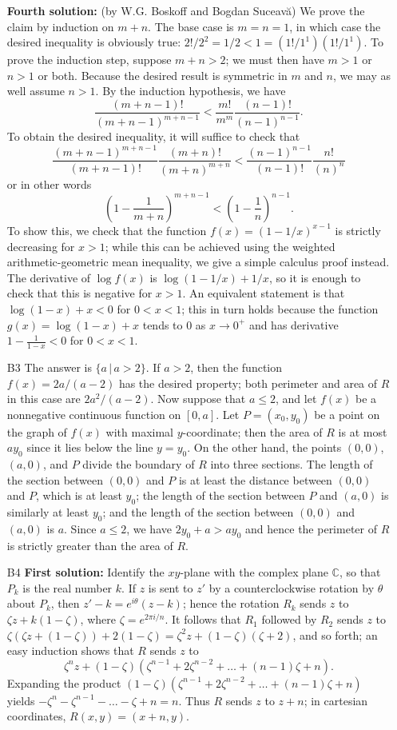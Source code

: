 \documentclass[amssymb,twocolumn,pra,10pt,aps]{revtex4-1}
\begin{document}
\begin{itemize}
\textbf{Fourth solution:} (by W.G. Boskoff and Bogdan Suceav\u{a})
We prove the claim by induction on $m+n$. The base case is $m=n=1$, in which case
the desired inequality is obviously true: $2!/2^2 = 1/2 < 1 = (1!/1^1)(1!/1^1)$.
To prove the induction step, suppose $m+n > 2$; we must then have $m>1$ or $n>1$ or both.
Because the desired result is symmetric in $m$ and $n$, we may as well assume $n > 1$.
By the induction hypothesis, we have
\[
\frac{(m+n-1)!}{(m+n-1)^{m+n-1}} < \frac{m!}{m^m} \frac{(n-1)!}{(n-1)^{n-1}}.
\]
To obtain the desired inequality, it will suffice to check that
\[
\frac{(m+n-1)^{m+n-1}}{(m+n-1)!} \frac{(m+n)!}{(m+n)^{m+n}}< \frac{(n-1)^{n-1}}{(n-1)!} \frac{n!}{(n)^{n}}
\]
or in other words
\[
\left( 1 - \frac{1}{m+n} \right)^{m+n-1} < \left(1 - \frac{1}{n} \right)^{n-1}.
\]
To show this, we check that the function $f(x) = (1 - 1/x)^{x-1}$
is strictly decreasing for $x>1$; while this can be achieved using the weighted arithmetic-geometric mean
inequality, we give a simple calculus proof instead. The derivative of $\log f(x)$ is
$\log (1-1/x) + 1/x$, so it is enough to check that this is negative for $x>1$.
An equivalent statement is that $\log (1-x) + x < 0$ for $0 < x < 1$;
this in turn holds because the function $g(x) = \log(1-x) + x$ tends to 0 as $x \to 0^+$
and has derivative $1 - \frac{1}{1-x} < 0$ for $0 < x < 1$.

\item[B3]
The answer is $\{a\,|\,a>2\}$. If $a>2$, then the function $f(x) =
2a/(a-2)$ has the desired property; both perimeter and area of $R$
in this case are $2a^2/(a-2)$. Now suppose that $a\leq 2$, and let
$f(x)$ be a nonnegative continuous function on $[0,a]$. Let
$P=(x_0,y_0)$ be a point on the graph of $f(x)$ with maximal
$y$-coordinate; then the area of $R$ is at most $ay_0$ since it lies
below the line $y=y_0$. On the other hand, the points $(0,0)$,
$(a,0)$, and $P$ divide the boundary of $R$ into three sections. The
length of the section between $(0,0)$ and $P$ is at least the
distance between $(0,0)$ and $P$, which is at least $y_0$; the
length of the section between $P$ and $(a,0)$ is similarly at least
$y_0$; and the length of the section between $(0,0)$ and $(a,0)$ is
$a$. Since $a\leq 2$, we have $2y_0 + a > ay_0$ and hence the
perimeter of $R$ is strictly greater than the area of $R$.

\item[B4]
\textbf{First solution:}
Identify the $xy$-plane with the complex plane $\mathbb{C}$, so that
$P_k$ is the real number $k$. If $z$ is sent to $z'$ by a
counterclockwise rotation by $\theta$ about $P_k$, then $z'-k =
e^{i\theta} (z-k)$; hence the rotation $R_k$ sends $z$ to $\zeta z +
k (1-\zeta)$, where $\zeta = e^{2\pi i/n}$. It follows that $R_1$
followed by $R_2$ sends $z$ to $\zeta(\zeta z +(1-\zeta)) + 2
(1-\zeta) = \zeta^2 z + (1-\zeta)(\zeta + 2)$, and so forth; an easy
induction shows that $R$ sends $z$ to
\[
\zeta^n z + (1-\zeta)(\zeta^{n-1} + 2 \zeta^{n-2} + \dots + (n-1)
\zeta + n).
\]
Expanding the product $(1-\zeta)(\zeta^{n-1} + 2 \zeta^{n-2} + \dots
+ (n-1) \zeta + n)$ yields $-\zeta^n - \zeta^{n-1} - \dots - \zeta +
n = n$. Thus $R$ sends $z$ to $z+n$; in cartesian coordinates,
$R(x,y) = (x+n,y)$.


\end{itemize}
\end{document}
